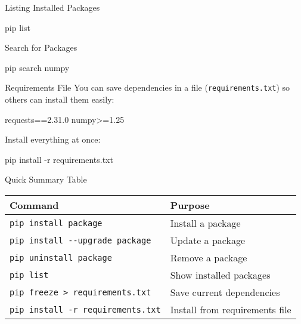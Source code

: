 \documentclass[
  letterpaper,
  DIV=11,
  numbers=noendperiod]{scrreprt}
\newenvironment{Shaded}{\begin{snugshade}}{\end{snugshade}}
\newcommand{\AttributeTok}[1]{\textcolor[rgb]{0.40,0.45,0.13}{#1}}
\newcommand{\ExtensionTok}[1]{\textcolor[rgb]{0.00,0.23,0.31}{#1}}
\newcommand{\NormalTok}[1]{\textcolor[rgb]{0.00,0.23,0.31}{#1}}
\begin{document}
Listing Installed Packages

\begin{Shaded}
\begin{Highlighting}[]
\ExtensionTok{pip}\NormalTok{ list}
\end{Highlighting}
\end{Shaded}

Search for Packages

\begin{Shaded}
\begin{Highlighting}[]
\ExtensionTok{pip}\NormalTok{ search numpy}
\end{Highlighting}
\end{Shaded}

Requirements File You can save dependencies in a file
(\texttt{requirements.txt}) so others can install them easily:

\begin{Shaded}
\begin{Highlighting}[]
\NormalTok{requests==2.31.0}
\NormalTok{numpy\textgreater{}=1.25}
\end{Highlighting}
\end{Shaded}

Install everything at once:

\begin{Shaded}
\begin{Highlighting}[]
\ExtensionTok{pip}\NormalTok{ install }\AttributeTok{{-}r}\NormalTok{ requirements.txt}
\end{Highlighting}
\end{Shaded}

Quick Summary Table

\begin{longtable}[]{@{}ll@{}}
\toprule\noalign{}
Command & Purpose \\
\midrule\noalign{}
\endhead
\bottomrule\noalign{}
\endlastfoot
\texttt{pip\ install\ package} & Install a package \\
\texttt{pip\ install\ -\/-upgrade\ package} & Update a package \\
\texttt{pip\ uninstall\ package} & Remove a package \\
\texttt{pip\ list} & Show installed packages \\
\texttt{pip\ freeze\ \textgreater{}\ requirements.txt} & Save current
dependencies \\
\texttt{pip\ install\ -r\ requirements.txt} & Install from requirements
file \\
\end{longtable}
\end{document}
